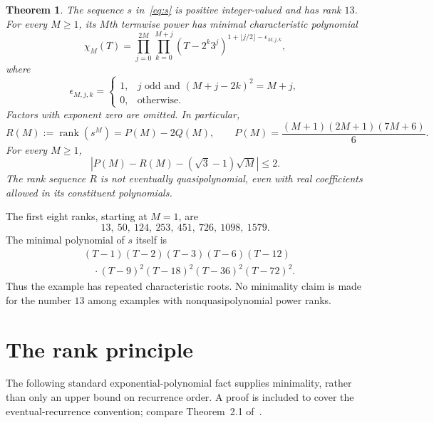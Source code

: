 \documentclass[11pt,a4paper]{article}
\newtheorem{theorem}{Theorem}
\newcommand{\rank}{\operatorname{rank}}
\begin{document}
\begin{theorem}\label{thm:main}
The sequence $s$ in~\eqref{eq:s} is positive integer-valued and has rank $13$.
For every $M\ge1$, its $M$th termwise power has minimal characteristic polynomial
\begin{equation}\label{eq:chi}
 \chi_M(T)=\prod_{j=0}^{2M}\prod_{k=0}^{M+j}
 (T-2^k3^j)^{1+\lfloor j/2\rfloor-\epsilon_{M,j,k}},
\end{equation}
where
\[
 \epsilon_{M,j,k}=
 \begin{cases}
 1,&j\text{ odd and }(M+j-2k)^2=M+j,\\
 0,&\text{otherwise}.
 \end{cases}
\]
Factors with exponent zero are omitted. In particular,
\begin{equation}\label{eq:rank}
 R(M):=\rank(s^M)=P(M)-2Q(M),\qquad
 P(M)=\frac{(M+1)(2M+1)(7M+6)}6.
\end{equation}
For every $M\ge1$,
\begin{equation}\label{eq:asymp}
 \left|P(M)-R(M)-(\sqrt3-1)\sqrt M\right|\le2.
\end{equation}
The rank sequence $R$ is not eventually quasipolynomial, even with real
coefficients allowed in its constituent polynomials.
\end{theorem}

The first eight ranks, starting at $M=1$, are
\[
 13,\ 50,\ 124,\ 253,\ 451,\ 726,\ 1098,\ 1579.
\]
The minimal polynomial of $s$ itself is
\begin{equation}\label{eq:initialchi}
 \begin{split}
 &(T-1)(T-2)(T-3)(T-6)(T-12)\\[-2pt]
 &\hspace{1em}\cdot(T-9)^2(T-18)^2(T-36)^2(T-72)^2.
 \end{split}
\end{equation}
Thus the example has repeated characteristic roots. No minimality claim is made
for the number $13$ among examples with nonquasipolynomial power ranks.

\section{The rank principle}
The following standard exponential-polynomial fact supplies minimality, rather
than only an upper bound on recurrence order. A proof is included to cover the
eventual-recurrence convention; compare Theorem~2.1 of~\cite{RowlandSistos}.
\end{document}
